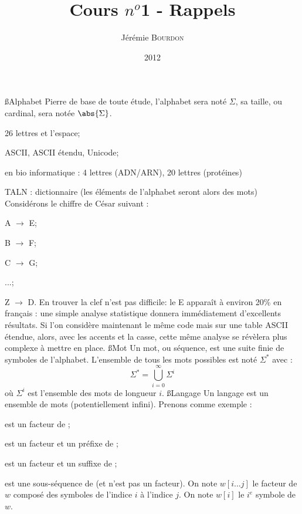 \documentclass[a4paper,11pt]{article}
\begin{document}
\title{Cours $n^o$1 - Rappels}
\author{Jérémie \textsc{Bourdon}}
\date{2012}
\maketitle
{}
 \ss{Alphabet}
  \p Pierre de base de toute étude, l'alphabet sera noté $\Sigma$, sa
  taille, ou cardinal, sera notée $\abs{\Sigma}$.
  \bi
   \item 26 lettres et l'espace;
   \item ASCII, ASCII étendu, Unicode;
   \item en bio informatique : 4 lettres (ADN/ARN), 20 lettres (protéines)
   \item TALN : dictionnaire (les éléments de l'alphabet seront alors des mots)
  \ei
  \p Considérons le chiffre de César suivant :\\
  \bi
   \item A $\rightarrow$ E;
   \item B $\rightarrow$ F;
   \item C $\rightarrow$ G;
   \item ...;
   \item Z $\rightarrow$ D.
  \ei
  \p En trouver la clef n'est pas difficile: le E apparaît à environ 20\%{} en
  français : une simple analyse statistique donnera immédiatement
  d'excellents résultats. Si l'on considère maintenant le même code mais sur une
  table ASCII étendue, alors, avec les accents et la casse, cette même analyse se
  révèlera plus complexe à mettre en place.
 \ss{Mot}
 \p Un mot, ou séquence, est une suite finie de symboles de l'alphabet. L'ensemble
 de tous les mots possibles est noté $\Sigma^*$ avec :
 \[
 \Sigma^* = \bigcup^{\infty}_{i = 0} \Sigma^i
 \]
 où $\Sigma^i$ est l'ensemble des mots de longueur $i$.
 \ss{Langage}
 \p Un langage est un ensemble de mots (potentiellement infini).
 \p Prenons comme exemple  :\\
 \bi
  \item {} est un facteur de ;
  \item {} est un facteur et un préfixe de ;
  \item {} est un facteur et un suffixe de ;
  \item {} est une sous-séquence de  (et n'est pas un facteur).
 \ei
 \p On note $w[i...j]$ le facteur de $w$ composé des symboles de l'indice $i$ à
 l'indice $j$. On note $w[i]$ le $i^{e}$ symbole de $w$.
\end{document}
